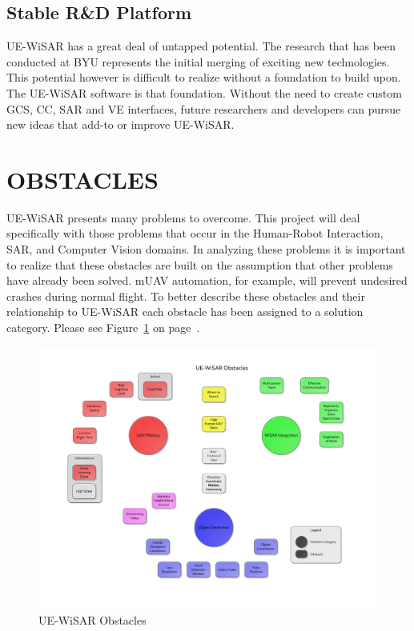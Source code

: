 \subsection{Stable R\&D Platform}
UE-WiSAR has a great deal of untapped potential.  The research that has been
conducted at BYU represents the initial merging of exciting new technologies.  This
potential however is difficult to realize without a foundation to build upon. 
The UE-WiSAR software is that foundation.  Without the need to create custom
GCS, CC, SAR and VE interfaces, future researchers and developers can pursue
new ideas that add-to or improve UE-WiSAR.

\section{OBSTACLES}
UE-WiSAR presents many problems to overcome.  This project will
deal specifically with those problems that occur in the Human-Robot Interaction,
SAR, and Computer Vision domains.  In analyzing these problems it is important
to realize that these obstacles are built on the assumption that other problems
have already been solved.  mUAV automation, for example, will prevent undesired
crashes during normal flight.  To better describe these obstacles and their
relationship to UE-WiSAR each obstacle has been assigned to a solution category.
Please see Figure~\ref{fig:obstaclemap} on page~\pageref{fig:obstaclemap}.

\begin{figure}[htp]
	\vspace{-80pt}
	\hspace{-80pt}
	\includegraphics[keepaspectratio=true, width=\paperheight,
	height=\paperheight, page=1, angle=90, scale=0.95,
	trim=20 0 20 0]{obstacle_solution_map.pdf}
	\caption{UE-WiSAR Obstacles}
	\label{fig:obstaclemap}
\end{figure}


